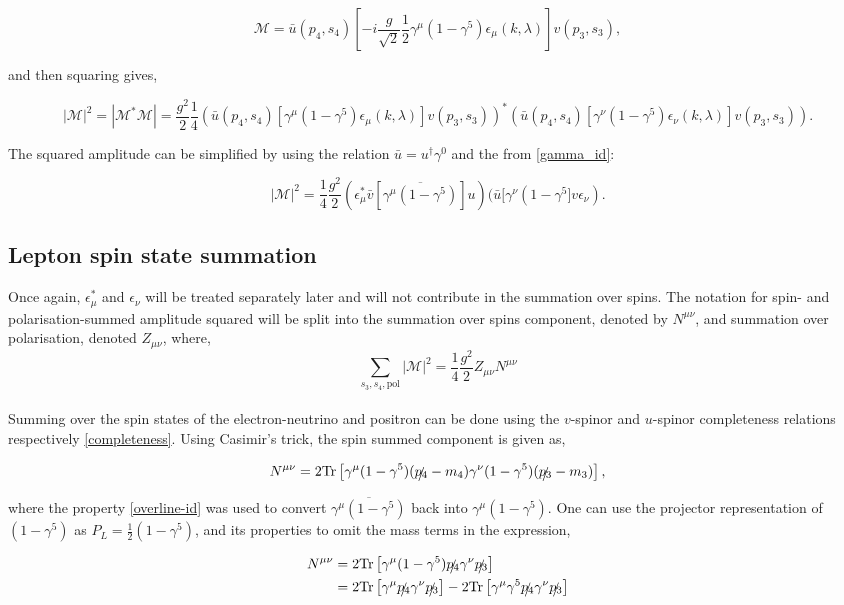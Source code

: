 \documentclass[a4paper,11pt]{article}
\begin{document}
$$\mathcal{M} =\bar{u}(p_4, s_4) \left[-i \frac{g}{\sqrt{2}}\frac{1}{2}\gamma^\mu (1-\gamma^5) \epsilon_\mu (k, \lambda)\right] v(p_3, s_3),  $$

and then squaring gives,

$$ |\mathcal{M}|^2= |\mathcal{M}^*\mathcal{M}|= \frac{g^2}{2}\frac{1}{4}\left(\bar{u}(p_4, s_4) \left[\gamma^\mu (1-\gamma^5) \epsilon_\mu (k, \lambda)\right] v(p_3, s_3)\right)^*\left(\bar{u}(p_4, s_4) \left[\gamma^\nu (1-\gamma^5) \epsilon_\nu (k, \lambda)\right] v(p_3, s_3)\right). $$

The squared amplitude can be simplified by using the relation $\bar{u} = u^{\dagger}\gamma^0$ and the 
 from \ref{gamma_id}:

$$|\mathcal{M}|^2 = \frac{1}{4} \frac{g^2}{2} (\epsilon_\mu^* \bar{v}[\overline{\gamma^\mu (1-\gamma^5)}]u)(\bar{u}[\gamma^\nu (1-\gamma^5] v \epsilon_\nu). $$

 \subsection{Lepton spin state summation}
 Once again, $\epsilon_{\mu}^*$ and $\epsilon_{\nu}$ will be treated separately later and will not contribute in the summation over spins. The notation for spin- and polarisation-summed amplitude squared will be split into the summation over spins component, denoted by $N^{\mu\nu}$, and summation over polarisation, denoted $Z_{\mu \nu}$, where, $$\sum_{s_3, s_4, \text{pol}}|\mathcal{M}|^2=  \frac{1}{4} \frac{g^2}{2} Z_{\mu\nu}N^{\mu\nu} $$\\
 
 Summing over the spin states of the electron-neutrino and positron can be done using the $v$-spinor and $u$-spinor completeness relations respectively \ref{completeness}. Using Casimir's trick, the spin summed component is given as,
 
 $$N^{\mu\nu}= 2\text{Tr}\left[\gamma^\mu (1-\gamma^5)(\slashed{p_4}-m_4)\gamma^\nu (1-\gamma^5) (\slashed{p_3}-m_3)\right],$$
 
 where the property \ref{overline-id} was used to convert $\overline{\gamma^\mu (1-\gamma^5)}$ back into $\gamma^\mu (1-\gamma^5).$ One can use the projector representation of $(1-\gamma^5)$ as $P_L = \frac{1}{2}(1-\gamma^5)$, and its properties to omit the mass terms in the expression, 
 
 \begin{equation}
 	\begin{aligned}
 		 N^{\mu\nu}&= 2\text{Tr}\left[\gamma^\mu (1-\gamma^5)\slashed{p_4}\gamma^\nu
 		\slashed{p_3}\right]\\
 		&= 2\text{Tr} \left[\gamma^\mu \slashed{p_4}\gamma^\nu \slashed{p_3}\right] - 2\text{Tr}\left[\gamma^\mu \gamma^5 \slashed{p_4}\gamma^\nu \slashed{p_3} \right]
 	\end{aligned}
 \end{equation}
\end{document}
